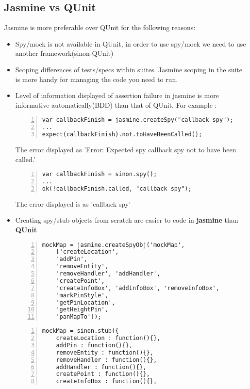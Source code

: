 \documentclass[a4paper,11pt]{article}
\begin{document}
	\subsection{ Jasmine vs QUnit}
	Jasmine is more preferable over QUnit for the following reasons:
	\begin{itemize}
	\item Spy/mock is not available in QUnit, in order to use spy/mock  we need to use another framework(sinon-QUnit)
	\item Scoping differences of tests/specs within suites. Jasmine scoping in the suite is more handy for managing the code you need to run.
	\item Level of information displayed of assertion failure in jasmine is more informative automatically(BDD) than that of QUnit. For example :
			\begin{lstlisting}[label=some-code-test,caption=Sample Jasmine Test Case,style = customjava, numbers=left]
var callbackFinish = jasmine.createSpy("callback spy");
...
expect(callbackFinish).not.toHaveBeenCalled();
			\end{lstlisting}			
			The error displayed as 'Error: Expected spy callback spy not to have been called.'
			\begin{lstlisting}[label=some-code-test,caption=Sample Qunit Test Case,style = customjava, numbers=left]
var callbackFinish = sinon.spy();
...
ok(!callbackFinish.called, "callback spy");
			\end{lstlisting}			
			The error displayed is as 'callback spy'		
	\item Creating spy/stub objects from scratch are easier to code in \textbf{jasmine} than \textbf{QUnit}
			\begin{lstlisting}[label=some-code-test,caption=Sample Jasmine Test Case For Creating Spy/Mock,style = customjava, numbers=left]
mockMap = jasmine.createSpyObj('mockMap',
	['createLocation',
	'addPin',
	'removeEntity',
	'removeHandler', 'addHandler',
	'createPoint',
	'createInfoBox', 'addInfoBox', 'removeInfoBox',
	'markPinStyle',
	'getPinLocation',
	'getHeightPin',
	'panMapTo']);
			\end{lstlisting}
			\begin{lstlisting}[label=some-code-test,caption=Sample QUnit Test Case For Creating Spy/Mock,style = customjava, numbers=left]
mockMap = sinon.stub({
	createLocation : function(){},
	addPin : function(){},
	removeEntity : function(){},
	removeHandler : function(){},
	addHandler : function(){},
	createPoint : function(){},
	createInfoBox : function(){},

\end{lstlisting}
\end{itemize}
\end{document}
